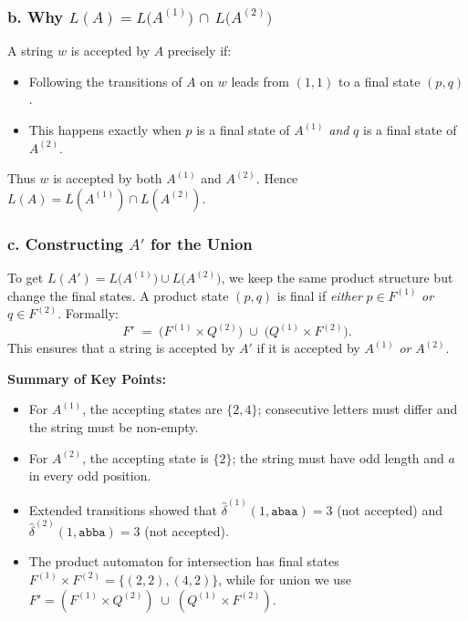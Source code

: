 \documentclass{article}
\theoremstyle{theorem}
\theoremstyle{definition}
\theoremstyle{remark}
\begin{document}
\subsubsection*{b. Why $L(A) = L\bigl(A^{(1)}\bigr)\,\cap\,L\bigl(A^{(2)}\bigr)$}

A string $w$ is accepted by $A$ precisely if:
\begin{itemize}
    \item Following the transitions of $A$ on $w$ leads from $(1,1)$ to a final state $(p,q)$.
    \item This happens exactly when $p$ is a final state of $A^{(1)}$ \emph{and} $q$ is a final state of $A^{(2)}$.
\end{itemize}
Thus $w$ is accepted by both $A^{(1)}$ and $A^{(2)}$. Hence $L(A) = L(A^{(1)}) \cap L(A^{(2)})$.

\subsubsection*{c. Constructing $A'$ for the Union}

To get $L(A') = L\bigl(A^{(1)}\bigr) \cup L\bigl(A^{(2)}\bigr)$, we keep the same product structure but change the final states. A product state $(p,q)$ is final if \emph{either} $p \in F^{(1)}$ \emph{or} $q \in F^{(2)}$. Formally:
\[
F' \;=\; \bigl(F^{(1)} \times Q^{(2)}\bigr) \;\cup\;\bigl(Q^{(1)} \times F^{(2)}\bigr).
\]
This ensures that a string is accepted by $A'$ if it is accepted by $A^{(1)}$ \emph{or} $A^{(2)}$.

\bigskip

\noindent \textbf{Summary of Key Points:}
\begin{itemize}
    \item For $A^{(1)}$, the accepting states are $\{2,4\}$; consecutive letters must differ and the string must be non-empty.
    \item For $A^{(2)}$, the accepting state is $\{2\}$; the string must have odd length and $a$ in every odd position.
    \item Extended transitions showed that $\widehat{\delta}^{(1)}(1,\texttt{abaa}) = 3$ (not accepted) and $\widehat{\delta}^{(2)}(1,\texttt{abba}) = 3$ (not accepted).
    \item The product automaton for intersection has final states $F^{(1)} \times F^{(2)} = \{(2,2), (4,2)\}$, while for union we use $F' = (F^{(1)} \times Q^{(2)}) \;\cup\; (Q^{(1)} \times F^{(2)})$.
\end{itemize}
\bigskip\bigskip\bigskip\bigskip\bigskip\bigskip\bigskip\bigskip\bigskip\bigskip\bigskip\bigskip
\end{document}
